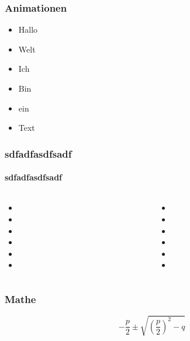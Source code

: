 \documentclass[12pt,ngerman]{beamer}
\begin{document}
\begin{frame}
\frametitle{Animationen}

\begin{itemize}
\item<2> Hallo
\item<-3> Welt
\item<1,3> Ich
\item<1-> Bin
\item ein
\item Text
\end{itemize}
\end{frame}

\begin{frame}
\frametitle{sdfadfasdfsadf}
\framesubtitle{sdfadfasdfsadf}


\begin{columns}
\begin{column}{0.49\textwidth}
\begin{itemize}
	\item 
	\item 
	\item 
	\item 
	\item 
	\item 
	\end{itemize}
\end{column}
\begin{column}{0.49\textwidth}
\begin{itemize}
	\item 
	\item 
	\item 
	\item 
	\item 
	\item 
	\end{itemize}
\end{column}
\end{columns}

\end{frame}


\begin{frame}
\frametitle{Mathe}

\begin{equation}
-\frac{p}{2} \pm \sqrt{ \left(\frac{p}{2} \right)^2 -q }
\end{equation}


\end{frame}
\end{document}
